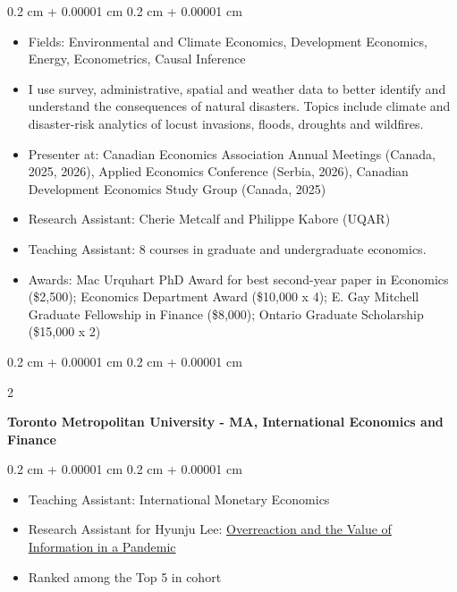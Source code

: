 \documentclass[10pt, a4paper]{article}
\newenvironment{highlights}{
    \begin{itemize}[
        topsep=0.10 cm,
        parsep=0.10 cm,
        partopsep=0pt,
        itemsep=0pt,
        leftmargin=0.4 cm + 10pt
    ]
}{
    \end{itemize}
} %
\newenvironment{onecolentry}{
    \begin{adjustwidth}{
        0.2 cm + 0.00001 cm
    }{
        0.2 cm + 0.00001 cm
    }
}{
    \end{adjustwidth}
} %
\newenvironment{twocolentry}[2][]{
    \onecolentry
    \def\secondColumn{#2}
    \setcolumnwidth{\fill, 4.5 cm}
    \begin{paracol}{2}
}{
    \switchcolumn \raggedleft \secondColumn
    \end{paracol}
    \endonecolentry
} %
\let\hrefWithoutArrow\href
\renewcommand{\href}[2]{\hrefWithoutArrow{#1}{\ifthenelse{\equal{#2}{}}{ }{#2 }\raisebox{.15ex}{\footnotesize \faExternalLink*}}}
\begin{document}
        \vspace{0.10 cm}
        \begin{onecolentry}
            \begin{highlights}
                \item Fields: Environmental and Climate Economics, Development Economics, Energy, Econometrics, Causal Inference
                \item I use survey, administrative, spatial and weather data to better identify and understand the consequences of natural disasters. Topics include climate and disaster-risk analytics of locust invasions, floods, droughts and wildfires. 
                \item Presenter at: Canadian Economics Association Annual Meetings (Canada, 2025, 2026), Applied Economics Conference (Serbia, 2026), Canadian Development Economics Study Group (Canada, 2025)
                \item Research Assistant: Cherie Metcalf and Philippe Kabore (UQAR)
                \item Teaching Assistant: 8 courses in graduate and undergraduate economics.
                \item Awards: Mac Urquhart PhD Award for best second-year paper in Economics (\$2,500); Economics Department Award (\$10,000 x 4); E. Gay Mitchell Graduate Fellowship in Finance (\$8,000); Ontario Graduate Scholarship (\$15,000 x 2)
            \end{highlights}
        \end{onecolentry}

\vspace{0.2 cm}
        \begin{twocolentry}{
 
        }
            \textbf{Toronto Metropolitan University - MA, International Economics and Finance}
            
        \end{twocolentry}

        \vspace{0.10 cm}
        \begin{onecolentry}
            \begin{highlights}
                \item Teaching Assistant: International Monetary Economics 
                \item Research Assistant for Hyunju Lee: \hrefWithoutArrow{https://papers.ssrn.com/sol3/papers.cfm?abstract_id=3910487}{Overreaction and the Value of Information in a Pandemic}
                \item Ranked among the Top 5 in cohort
            \end{highlights}
        \end{onecolentry}
\end{document}
